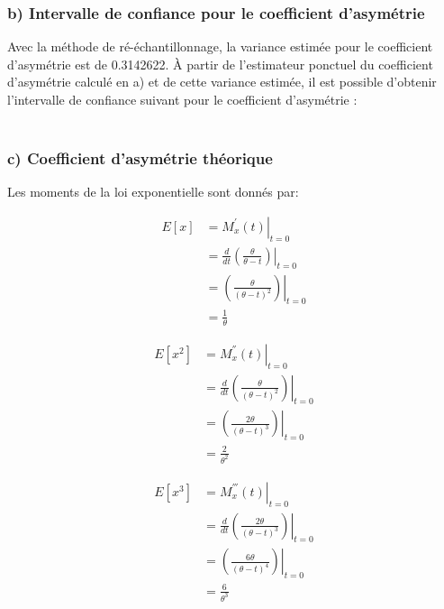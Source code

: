\documentclass[]{article}
\begin{document}
\newpage

\subsubsection{b) Intervalle de confiance pour le coefficient
d'asymétrie}\label{b-intervalle-de-confiance-pour-le-coefficient-dasymetrie}

Avec la méthode de ré-échantillonnage, la variance estimée pour le
coefficient d'asymétrie est de 0.3142622. À partir de l'estimateur
ponctuel du coefficient d'asymétrie calculé en a) et de cette variance
estimée, il est possible d'obtenir l'intervalle de confiance suivant
pour le coefficient d'asymétrie :

\begin{align*}
[0.2089363, 2.4064123]
\end{align*}

\subsubsection{c) Coefficient d'asymétrie
théorique}\label{c-coefficient-dasymetrie-theorique}

Les moments de la loi exponentielle sont donnés par:

\begin{minipage}{5cm}
    \begin{align*}
        E[x]   &= \left. M_x^{'}(t) \right|_{t=0} \\
       &= \frac{d}{dt} \left.\left( \frac{\theta}{\theta - t} \right)\right|_{t=0} \\
       &= \left.\left( \frac{\theta}{(\theta - t)^2} \right)\right|_{t=0} \\
       &= \frac{1}{\theta}
    \end{align*}
\end{minipage}\begin{minipage}{5cm}
    \begin{align*}
        E[x^2] &= \left. M_x^{''}(t) \right|_{t=0} \\
       &= \frac{d}{dt} \left.\left( \frac{\theta}{(\theta - t)^2} \right)\right|_{t=0} \\
       &= \left.\left( \frac{2 \theta}{(\theta - t)^3} \right)\right|_{t=0} \\
       &= \frac{2}{\theta^2}
    \end{align*}
\end{minipage}\begin{minipage}{5cm}
    \begin{align*}
        E[x^3] &= \left. M_x^{'''}(t) \right|_{t=0} \\
       &= \frac{d}{dt} \left.\left( \frac{2 \theta}{(\theta - t)^3} \right)\right|_{t=0} \\
       &= \left.\left( \frac{6 \theta}{(\theta - t)^4} \right)\right|_{t=0} \\
       &= \frac{6}{\theta^3}
    \end{align*}
\end{minipage}
\end{document}
